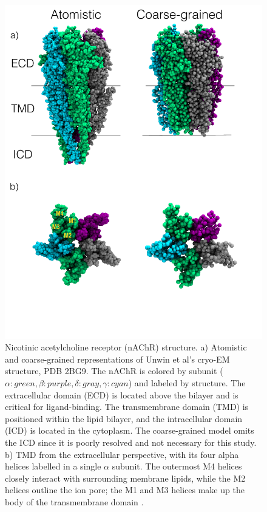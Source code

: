 \begin{figure}[htp]
\center
\includegraphics[width=.75\columnwidth,]{figure/figure1.pdf}
	\begin{flushleft}

\caption[Nicotinic acetylcholine receptor (nAChR) structure] {Nicotinic acetylcholine receptor (nAChR) structure. a) Atomistic and coarse-grained representations of Unwin et al's cryo-EM structure, PDB 2BG9. The nAChR is colored by subunit ($\alpha:green,\beta:purple,\delta:gray,\gamma:cyan$) and labeled by structure. The extracellular domain (ECD) is located above the bilayer and is critical for ligand-binding. The transmembrane domain (TMD) is positioned within the lipid bilayer, and the intracellular domain (ICD) is located in the cytoplasm. The coarse-grained model omits the ICD since it is poorly resolved and not necessary for this study. b) TMD from the extracellular perspective, with its four alpha helices labelled in a single $\alpha$ subunit. The outermost M4 helices closely interact with surrounding membrane lipids, while the M2 helices outline the ion pore; the M1 and M3 helices make up the body of the transmembrane domain \citep{Unwin2005}.}
	\end{flushleft}

  \label{fig:structure}
\end{figure}


